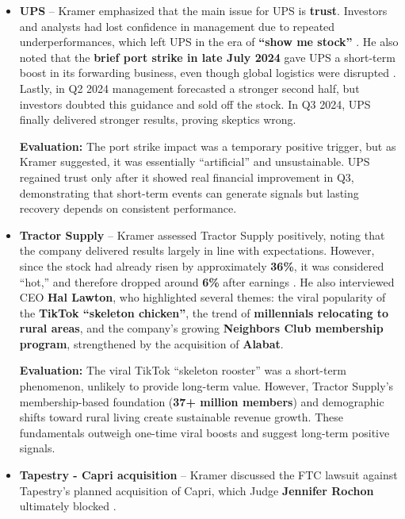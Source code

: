 \documentclass[12pt,a4paper]{article}
\begin{document}
\begin{itemize}
    \item \textbf{UPS} -- Kramer emphasized that the main issue for UPS is \textbf{trust}. 
    Investors and analysts had lost confidence in management due to repeated underperformances, which left UPS in the era of \textbf{“show me stock”} \cite{cnbc}. 
    He also noted that the \textbf{brief port strike in late July 2024} gave UPS a short-term boost in its forwarding business, 
    even though global logistics were disrupted \cite{reutersUPS}. 
    Lastly, in Q2 2024 management forecasted a stronger second half, but investors doubted this guidance and sold off the stock. 
    In Q3 2024, UPS finally delivered stronger results, proving skeptics wrong. 
\vspace{0.3cm}

    \textbf{Evaluation:} The port strike impact was a temporary positive trigger, but as Kramer suggested, 
    it was essentially “artificial” and unsustainable. 
    UPS regained trust only after it showed real financial improvement in Q3, 
    demonstrating that short-term events can generate signals but lasting recovery depends on consistent performance.
\vspace{0.7cm}


    \item \textbf{Tractor Supply} -- Kramer assessed Tractor Supply positively, 
    noting that the company delivered results largely in line with expectations. 
    However, since the stock had already risen by approximately \textbf{36\%}, 
    it was considered “hot,” and therefore dropped around \textbf{6\%} after earnings \cite{cnbc}. 
    He also interviewed CEO \textbf{Hal Lawton}, 
    who highlighted several themes: the viral popularity of the \textbf{TikTok “skeleton chicken”}, 
    the trend of \textbf{millennials relocating to rural areas}, 
    and the company’s growing \textbf{Neighbors Club membership program}, 
    strengthened by the acquisition of \textbf{Alabat}.
\vspace{0.3cm}

     \textbf{Evaluation:} The viral TikTok “skeleton rooster” was a short-term phenomenon, unlikely to provide long-term value. 
    However, Tractor Supply’s membership-based foundation (\textbf{37+ million members}) 
    and demographic shifts toward rural living create sustainable revenue growth. 
    These fundamentals outweigh one-time viral boosts and suggest long-term positive signals.
\vspace{0.7cm}


    \item \textbf{Tapestry - Capri acquisition} -- Kramer discussed the FTC lawsuit against Tapestry’s planned acquisition of Capri, 
    which Judge \textbf{Jennifer Rochon} ultimately blocked \cite{ftc}. 
\vspace{0.3cm}
    

\end{itemize}
\end{document}
